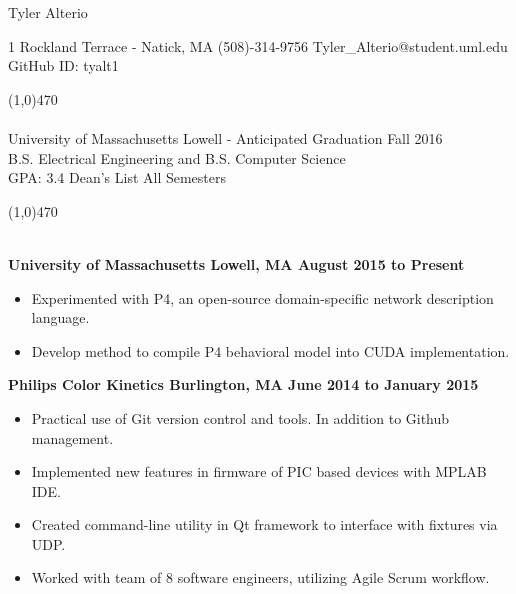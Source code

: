 \documentclass[11pt, a4paper]{article} %
\begin{document}
\centerline{\Huge \sc Tyler Alterio}

\centerline{1 Rockland Terrace - Natick, MA \textbullet \hspace{1pt} (508)-314-9756 \textbullet \hspace{1pt} Tyler\_{}Alterio@student.uml.edu \textbullet \hspace{1pt} GitHub ID: tyalt1}

\noindent \line(1,0){470}\\

\smallskip \\
University of Massachusetts Lowell - Anticipated Graduation Fall 2016 \\
B.S. Electrical Engineering and B.S. Computer Science \\
GPA: 3.4 \hspace{75pt} Dean's List All Semesters

\noindent \line(1,0){470}\\

\smallskip \\
\centerline{\bf University of Massachusetts \textbullet \hspace{1pt} Lowell, MA \hfill August 2015 to Present}
\begin{itemize}
\itemsep0em
	\item Experimented with P4, an open-source domain-specific network description language.
	\item Develop method to compile P4 behavioral model into CUDA implementation.
\end{itemize}


\centerline{\bf Philips Color Kinetics \textbullet \hspace{1pt} Burlington, MA \hfill June 2014 to January 2015}
\begin{itemize}
\itemsep0em
	\item Practical use of Git version control and tools. In addition to Github management.
	\item Implemented new features in firmware of PIC based devices with MPLAB IDE.
	\item Created command-line utility in Qt framework to interface with fixtures via UDP.
	\item Worked with team of 8 software engineers, utilizing Agile Scrum workflow.
\end{itemize}
\end{document}
